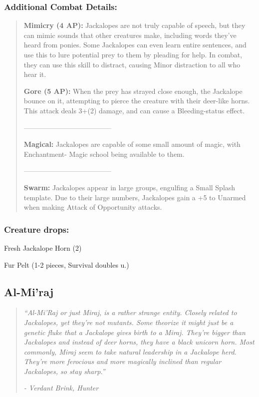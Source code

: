 \documentclass[11pt,a4paper,twocolumn]{book}
\begin{document}
	\subsubsection*{Additional Combat Details:}
	\begin{verse}
		\textbf{Mimicry (4 AP):} Jackalopes are not truly capable of speech, but they can mimic sounds that other creatures make, including words they've heard from ponies. Some Jackalopes can even learn entire sentences, and use this to lure potential prey to them by pleading for help. In combat, they can use this skill to distract, causing Minor distraction to all who hear it.
		
		\textbf{Gore (5 AP):} When the prey has strayed close enough, the Jackalope bounce on it, attempting to pierce the creature with their deer-like horns. This attack deals 3+(2) damage, and can cause a Bleeding-status effect.
		
		--------------------------------------
		
		\textbf{Magical:} Jackalopes are capable of some small amount of magic, with Enchantment- Magic school being available to them.
		
		--------------------------------------
		
		\textbf{Swarm:} Jackalopes appear in large groups, engulfing a Small Splash template. Due to their large numbers, Jackalopes gain a +5 to Unarmed when making Attack of Opportunity attacks.		

	\end{verse}
	
	\subsubsection*{Creature drops:}
	\begin{compactitem}
		\item Fresh Jackalope Horn (2)
		\item Fur Pelt (1-2 pieces, Survival doubles u.)
	\end{compactitem}
	
	\vfill
	\subsection*{Al-Mi'raj}
	\begin{quote}
		\emph{``Al-Mi'Raj or just Miraj, is a rather strange entity. Closely related to Jackalopes, yet they're not mutants. Some theorize it might just be a genetic fluke that a Jackalope gives birth to a Miraj. They're bigger than Jackalopes and instead of deer horns, they have a black unicorn horn. Most commonly, Miraj seem to take natural leadership in a Jackalope herd. They're more ferocious and more magically inclined than regular Jackalopes, so stay sharp.''}
		
		\emph{-	Verdant Brink, Hunter}
	\end{quote}
	
\end{document}
